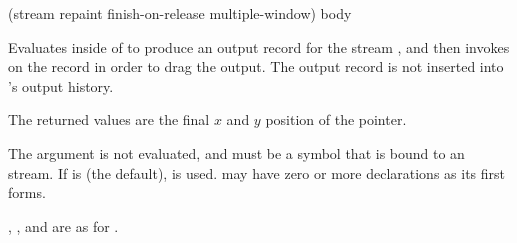  {(\optional stream 
                              \key repaint finish-on-release multiple-window)
                             \body body}

Evaluates  inside of  to produce an
output record for the stream , and then invokes
 on the record in order to drag the output.  The output
record is not inserted into 's output history.

The returned values are the final $x$ and $y$ position of the pointer.

The  argument is not evaluated, and must be a symbol that is bound
to an  stream.  If  is  (the
default),  is used.   may have zero or more
declarations as its first forms.

, , and  are as for
.

